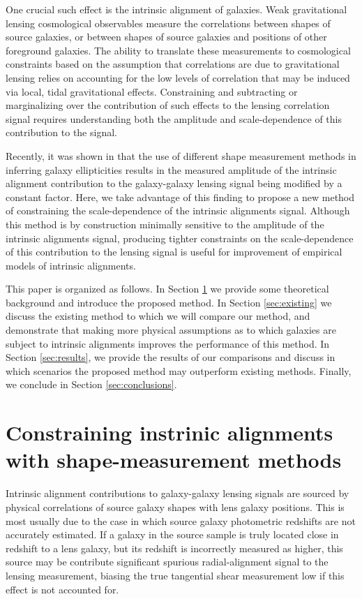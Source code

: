 \documentclass[a4paper,fleqn,usenatbib,useAMS]{mnras}
\begin{document}
One crucial such effect is the intrinsic alignment of galaxies. Weak gravitational lensing cosmological observables measure the correlations between shapes of source galaxies, or between shapes of source galaxies and positions of other foreground galaxies. The ability to translate these measurements to cosmological constraints based on the assumption that correlations are due to gravitational lensing relies on accounting for the low levels of correlation that may be induced via local, tidal gravitational effects. Constraining and subtracting or marginalizing over the contribution of such effects to the lensing correlation signal requires understanding both the amplitude and scale-dependence of this contribution to the signal.

Recently, it was shown in \cite{Singh2016} that the use of different shape measurement methods in inferring galaxy ellipticities results in the measured amplitude of the intrinsic alignment contribution to the galaxy-galaxy lensing signal being modified by a constant factor. Here, we take advantage of this finding to propose a new method of constraining the scale-dependence of the intrinsic alignments signal. Although this method is by construction minimally sensitive to the amplitude of the intrinsic alignments signal, producing tighter constraints on the scale-dependence of this contribution to the lensing signal is useful for improvement of empirical models of intrinsic alignments.

This paper is organized as follows. In Section \ref{sec:newmethod} we provide some theoretical background and introduce the proposed method. In Section \ref{sec:existing} we discuss the existing method to which we will compare our method, and demonstrate that making more physical assumptions as to which galaxies are subject to intrinsic alignments improves the performance of this method. In Section \ref{sec:results}, we provide the results of our comparisons and discuss in which scenarios the proposed method may outperform existing methods. Finally, we conclude in Section \ref{sec:conclusions}. 

\section{Constraining instrinic alignments with shape-measurement methods}
\label{sec:newmethod}
Intrinsic alignment contributions to galaxy-galaxy lensing signals are sourced by physical correlations of source galaxy shapes with lens galaxy positions. This is most usually due to the case in which source galaxy photometric redshifts are not accurately estimated. If a galaxy in the source sample is truly located close in redshift to a lens galaxy, but its redshift is incorrectly measured as higher, this source may be contribute significant spurious radial-alignment signal to the lensing measurement, biasing the true tangential shear measurement low if this effect is not accounted for.
\end{document}
